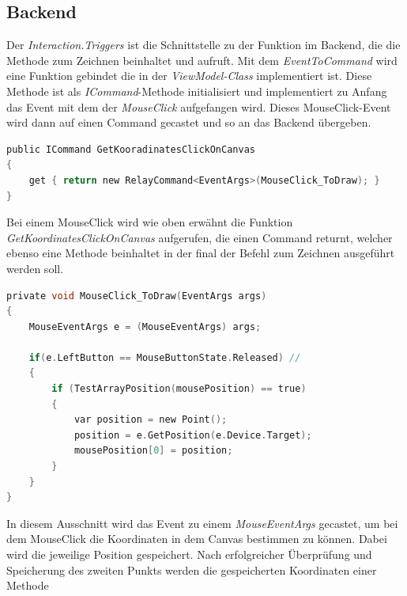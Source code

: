 \subsection{Backend}
Der \textit{Interaction.Triggers} ist die Schnittstelle zu der Funktion im Backend, die die Methode zum Zeichnen beinhaltet und aufruft. Mit dem 
\textit{EventToCommand} wird eine Funktion gebindet die in der \textit{ViewModel-Class} implementiert ist. Diese Methode ist als \textit{ICommand}-Methode 
initialisiert und implementiert zu Anfang das Event mit dem der \textit{MouseClick} aufgefangen wird. Dieses MouseClick-Event wird dann auf einen Command gecastet und so an 
das Backend übergeben. 
\\
\begin{lstlisting}[language=C,
    frame=single,           % Ein Rahmen um den Code
    framexleftmargin=15pt,  % Rahmen link von den Zahlen
    style=algoBericht,
    label={icommandclicksnippet},
    captionpos=b,           % Caption unter den Code setzen
caption={ICommand-OnClick Code-Ausschnitt}]
public ICommand GetKooradinatesClickOnCanvas
{
    get { return new RelayCommand<EventArgs>(MouseClick_ToDraw); }
}
\end{lstlisting}
Bei einem MouseClick wird wie oben erwähnt die Funktion \textit{GetKoordinatesClickOnCanvas} aufgerufen, die einen Command returnt, welcher ebenso eine 
Methode beinhaltet in der final der Befehl zum Zeichnen ausgeführt werden soll. 
\\
\begin{lstlisting}[language=C,
    frame=single,           % Ein Rahmen um den Code
    framexleftmargin=15pt,  % Rahmen link von den Zahlen
    style=algoBericht,
    label={mouseclicksnippet},
    captionpos=b,           % Caption unter den Code setzen
caption={MouseClick-Funktion Code-Ausschnitt}]
private void MouseClick_ToDraw(EventArgs args)
{
    MouseEventArgs e = (MouseEventArgs) args;

    if(e.LeftButton == MouseButtonState.Released) // 
    {
        if (TestArrayPosition(mousePosition) == true)
        {
            var position = new Point();
            position = e.GetPosition(e.Device.Target);
            mousePosition[0] = position;
        }
    }
}
\end{lstlisting}
In diesem Ausschnitt wird das Event zu einem \textit{MouseEventArgs} gecastet, um bei dem MouseClick die Koordinaten in dem Canvas bestimmen zu können. 
Dabei wird die jeweilige Position gespeichert. Nach erfolgreicher Überprüfung und Speicherung des zweiten Punkts werden die gespeicherten Koordinaten einer Methode 

